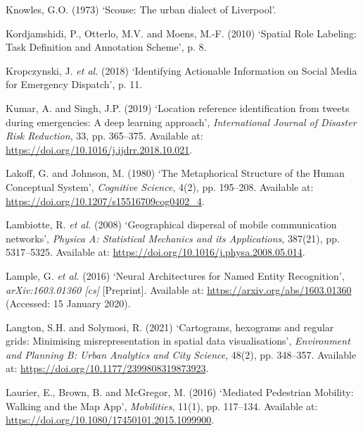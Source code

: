 \documentclass[
  letterpaper,
  11pt,
  english,
  onehalfspacing,
  headsepline]{MastersDoctoralThesis}
\newlength{\cslhangindent}
\newlength{\cslentryspacingunit} %
\newenvironment{CSLReferences}[2] %
 {%
  \setlength{\parindent}{0pt}
  \ifodd #1
  \let\oldpar\par
  \def\par{\hangindent=\cslhangindent\oldpar}
  \fi
  \setlength{\parskip}{#2\cslentryspacingunit}
 }%
 {}
\begin{document}
\begin{CSLReferences}{0}{0}
\leavevmode{}%
Knowles, G.O. (1973) {`Scouse: The urban dialect of {Liverpool}'}.

\leavevmode{}%
Kordjamshidi, P., Otterlo, M.V. and Moens, M.-F. (2010) {`Spatial {Role
Labeling}: {Task Definition} and {Annotation Scheme}'}, p. 8.

\leavevmode{}%
Kropczynski, J. \emph{et al.} (2018) {`Identifying {Actionable
Information} on {Social Media} for {Emergency Dispatch}'}, p. 11.

\leavevmode{}%
Kumar, A. and Singh, J.P. (2019) {`Location reference identification
from tweets during emergencies: {A} deep learning approach'},
\emph{International Journal of Disaster Risk Reduction}, 33, pp.
365--375. Available at:
\url{https://doi.org/10.1016/j.ijdrr.2018.10.021}.

\leavevmode{}%
Lakoff, G. and Johnson, M. (1980) {`The {Metaphorical Structure} of the
{Human Conceptual System}'}, \emph{Cognitive Science}, 4(2), pp.
195--208. Available at:
\url{https://doi.org/10.1207/s15516709cog0402_4}.

\leavevmode{}%
Lambiotte, R. \emph{et al.} (2008) {`Geographical dispersal of mobile
communication networks'}, \emph{Physica A: Statistical Mechanics and its
Applications}, 387(21), pp. 5317--5325. Available at:
\url{https://doi.org/10.1016/j.physa.2008.05.014}.

\leavevmode{}%
Lample, G. \emph{et al.} (2016) {`Neural {Architectures} for {Named
Entity Recognition}'}, \emph{arXiv:1603.01360 {[}cs{]}} {[}Preprint{]}.
Available at: \url{https://arxiv.org/abs/1603.01360} (Accessed: 15
January 2020).

\leavevmode{}%
Langton, S.H. and Solymosi, R. (2021) {`Cartograms, hexograms and
regular grids: {Minimising} misrepresentation in spatial data
visualisations'}, \emph{Environment and Planning B: Urban Analytics and
City Science}, 48(2), pp. 348--357. Available at:
\url{https://doi.org/10.1177/2399808319873923}.

\leavevmode{}%
Laurier, E., Brown, B. and McGregor, M. (2016) {`Mediated {Pedestrian
Mobility}: {Walking} and the {Map App}'}, \emph{Mobilities}, 11(1), pp.
117--134. Available at:
\url{https://doi.org/10.1080/17450101.2015.1099900}.


\end{CSLReferences}
\end{document}
